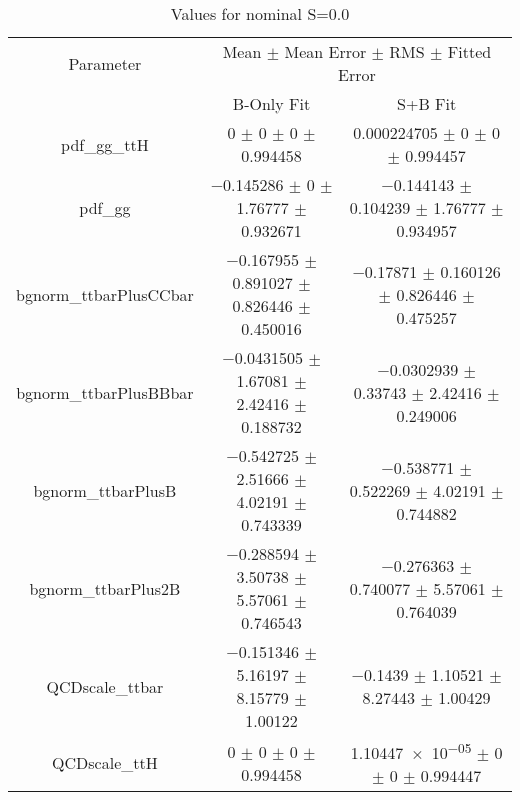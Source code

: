 \begin{table}
\centering
\caption{Values for nominal S=0.0}
\begin{tabular}{ccc}
\toprule
Parameter & \multicolumn{2}{c}{Mean $\pm$ Mean Error $\pm$ RMS $\pm$ Fitted Error}\\
 & B-Only Fit & S+B Fit\\
\midrule
pdf\_gg\_ttH & \num{0} $\pm$ \num{0} $\pm$ \num{0} $\pm$ \num{0.994458} & \num{0.000224705} $\pm$ \num{0} $\pm$ \num{0} $\pm$ \num{0.994457}\\
pdf\_gg & \num{-0.145286} $\pm$ \num{0} $\pm$ \num{1.76777} $\pm$ \num{0.932671} & \num{-0.144143} $\pm$ \num{0.104239} $\pm$ \num{1.76777} $\pm$ \num{0.934957}\\
bgnorm\_ttbarPlusCCbar & \num{-0.167955} $\pm$ \num{0.891027} $\pm$ \num{0.826446} $\pm$ \num{0.450016} & \num{-0.17871} $\pm$ \num{0.160126} $\pm$ \num{0.826446} $\pm$ \num{0.475257}\\
bgnorm\_ttbarPlusBBbar & \num{-0.0431505} $\pm$ \num{1.67081} $\pm$ \num{2.42416} $\pm$ \num{0.188732} & \num{-0.0302939} $\pm$ \num{0.33743} $\pm$ \num{2.42416} $\pm$ \num{0.249006}\\
bgnorm\_ttbarPlusB & \num{-0.542725} $\pm$ \num{2.51666} $\pm$ \num{4.02191} $\pm$ \num{0.743339} & \num{-0.538771} $\pm$ \num{0.522269} $\pm$ \num{4.02191} $\pm$ \num{0.744882}\\
bgnorm\_ttbarPlus2B & \num{-0.288594} $\pm$ \num{3.50738} $\pm$ \num{5.57061} $\pm$ \num{0.746543} & \num{-0.276363} $\pm$ \num{0.740077} $\pm$ \num{5.57061} $\pm$ \num{0.764039}\\
QCDscale\_ttbar & \num{-0.151346} $\pm$ \num{5.16197} $\pm$ \num{8.15779} $\pm$ \num{1.00122} & \num{-0.1439} $\pm$ \num{1.10521} $\pm$ \num{8.27443} $\pm$ \num{1.00429}\\
QCDscale\_ttH & \num{0} $\pm$ \num{0} $\pm$ \num{0} $\pm$ \num{0.994458} & \num{1.10447e-05} $\pm$ \num{0} $\pm$ \num{0} $\pm$ \num{0.994447}\\
\bottomrule
\end{tabular}
\end{table}